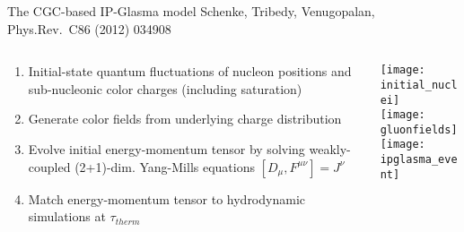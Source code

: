 \documentclass[svgnames]{beamer}
\begin{document}
\begin{frame}[t]{The CGC-based IP-Glasma model}
{\centering Schenke, Tribedy, Venugopalan, Phys.Rev.\ C86 (2012) 034908}
  
  \begin{columns}[T]
   \begin{column}{0.6\textwidth}
    \begin{enumerate}
      \item Initial-state quantum fluctuations of nucleon positions and sub-nucleonic color charges (including saturation)
      \vspace{0.2 in}
      \item Generate color fields from underlying charge distribution
      \vspace{0.2 in}
      \item Evolve initial energy-momentum tensor by solving weakly-coupled (2+1)-dim. Yang-Mills equations $[D_\mu,F^{\mu\nu}] = J^\nu$
      \vspace{0.2 in}
      \item Match energy-momentum tensor to hydrodynamic simulations at $\tau_{therm}$
    \end{enumerate}
   \end{column}
   
   \begin{column}{0.4\textwidth}
    \centering
    \vspace{-0.1 in}
    \texttt{[image: initial\_nuclei]}\\
    \texttt{[image: gluonfields]} \\
    \vspace{0.1 in}
    \texttt{[image: ipglasma\_event]}
   \end{column}

  \end{columns}
  
\end{frame}
\end{document}

